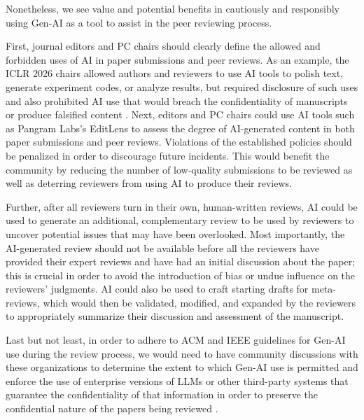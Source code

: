 \documentclass[sigconf]{acmart}
\begin{document}
Nonetheless, we see value and potential benefits in cautiously and responsibly using Gen-AI as a tool to assist in the peer reviewing process.

First, journal editors and PC chairs should clearly define the allowed and forbidden uses of AI in paper submissions and peer reviews. As an example, the ICLR 2026 chairs allowed authors and reviewers to use AI tools to polish text, generate experiment codes, or analyze results, but required disclosure of such uses and also prohibited AI use that would breach the confidentiality of manuscripts or produce falsified content \cite{Naddaf2025B}. Next, editors and PC chairs could use AI tools such as Pangram Labs's EditLens \cite{Naddaf2025B, Thai2025} to assess the degree of AI-generated content in both paper submissions and peer reviews. Violations of the established policies should be penalized in order to discourage future incidents. This would benefit the community by reducing the number of low-quality submissions to be reviewed as well as deterring reviewers from using AI to produce their reviews.

Further, after all reviewers turn in their own, human-written reviews, AI could be used to generate an additional, complementary review to be used by reviewers to uncover potential issues that may have been overlooked. Most importantly, the AI-generated review should not be available before all the reviewers have provided their expert reviews and have had an initial discussion about the paper; this is crucial in order to avoid the introduction of bias or undue influence on the reviewers' judgments. AI could also be used to craft starting drafts for  meta-reviews, which would then be validated, modified, and expanded by the reviewers to appropriately summarize their discussion and assessment of the manuscript.

Last but not least, in order to adhere to ACM and IEEE guidelines for Gen-AI use during the review process, we would need to have community discussions with these organizations to determine the extent to which Gen-AI use is permitted and enforce the use of enterprise versions of LLMs or other third-party systems that guarantee the confidentiality of that information in order to preserve the confidential nature of the papers being reviewed \cite{ACMpeer}. 

\end{document}
